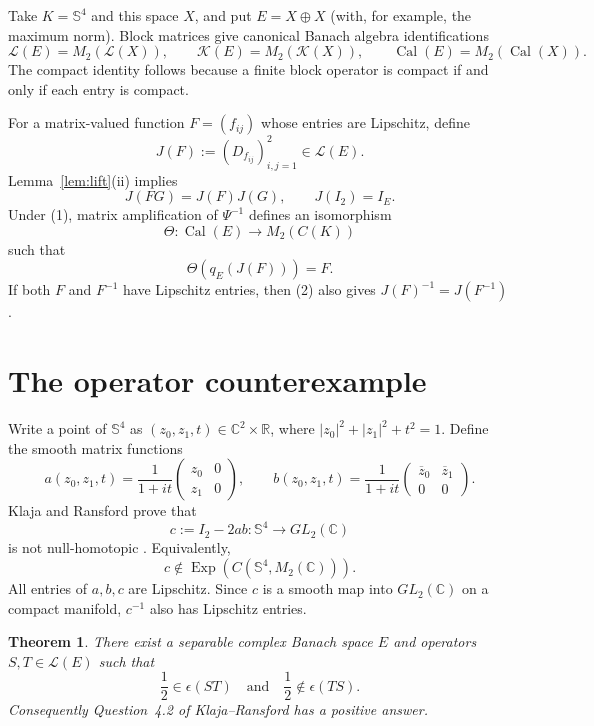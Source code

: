 \documentclass[11pt]{article}
\newtheorem{theorem}{Theorem}
\theoremstyle{remark}
\newcommand{\C}{\mathbb C}
\newcommand{\Sph}{\mathbb S}
\newcommand{\cL}{\mathcal L}
\newcommand{\cK}{\mathcal K}
\newcommand{\Cal}{\operatorname{Cal}}
\newcommand{\Exp}{\operatorname{Exp}}
\newcommand{\eps}{\epsilon}
\begin{document}
Take $K=\Sph^4$ and this space $X$, and put $E=X\oplus X$ (with, for
example, the maximum norm).  Block matrices give canonical Banach algebra
identifications
\[
 \cL(E)=M_2(\cL(X)),\qquad
 \cK(E)=M_2(\cK(X)),\qquad
 \Cal(E)=M_2(\Cal(X)).                                      \tag{1}
\]
The compact identity follows because a finite block operator is compact if
and only if each entry is compact.

For a matrix-valued function $F=(f_{ij})$ whose entries are Lipschitz, define
\[
 J(F):=(D_{f_{ij}})_{i,j=1}^2\in\cL(E).
\]
Lemma~\ref{lem:lift}(ii) implies
\[
 J(FG)=J(F)J(G),\qquad J(I_2)=I_E.                           \tag{2}
\]
Under (1), matrix amplification of $\Psi^{-1}$ defines an isomorphism
\[
 \Theta:\Cal(E)\longrightarrow M_2(C(K))
\]
such that
\[
 \Theta(q_E(J(F)))=F.                                       \tag{3}
\]
If both $F$ and $F^{-1}$ have Lipschitz entries, then (2) also gives
$J(F)^{-1}=J(F^{-1})$.

\section{The operator counterexample}

Write a point of $\Sph^4$ as $(z_0,z_1,t)\in\C^2\times\mathbb R$, where
$|z_0|^2+|z_1|^2+t^2=1$.  Define the smooth matrix functions
\[
 a(z_0,z_1,t)=\frac{1}{1+it}
 \begin{pmatrix}z_0&0\\z_1&0\end{pmatrix},\qquad
 b(z_0,z_1,t)=\frac{1}{1+it}
 \begin{pmatrix}\overline z_0&\overline z_1\\0&0\end{pmatrix}.       \tag{4}
\]
Klaja and Ransford prove that
\[
 c:=I_2-2ab:\Sph^4\longrightarrow GL_2(\C)                 \tag{5}
\]
is not null-homotopic \cite[Theorems~1.1 and~1.2]{KR}.  Equivalently,
\[
 c\notin\Exp(C(\Sph^4,M_2(\C))).                           \tag{6}
\]
All entries of $a,b,c$ are Lipschitz.  Since $c$ is a smooth map into
$GL_2(\C)$ on a compact manifold, $c^{-1}$ also has Lipschitz entries.

\begin{theorem}\label{thm:main}
There exist a separable complex Banach space $E$ and operators
$S,T\in\cL(E)$ such that
\[
 \frac12\in\eps(ST)\quad\text{and}\quad
 \frac12\notin\eps(TS).
\]
Consequently Question~4.2 of Klaja--Ransford has a positive answer.
\end{theorem}
\end{document}
